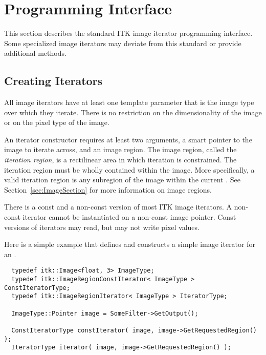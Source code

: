 \section{Programming Interface}
\label{sec:IteratorsInterface}

This section describes the standard ITK image iterator programming interface.
Some specialized image iterators may deviate from this standard or provide
additional methods.

\subsection{Creating Iterators}
\label{sec:CreatingIterators}

All image iterators have at least one template parameter that is the image
type over which they iterate.  There is no restriction on the dimensionality
of the image or on the pixel type of the image.


An iterator constructor requires at least two arguments, a smart pointer to the
image to iterate across, and an image region. The image region, called the
\emph{iteration region}, is a rectilinear area in which iteration is
constrained.  The iteration region must be wholly contained within the image.
More specifically, a valid iteration region is any subregion of the image
within the current .  See Section~\ref{sec:ImageSection}
for more information on image regions.

There is a const and a non-const version of most ITK image iterators. A
non-const iterator cannot be instantiated on a non-const image pointer.
Const versions of iterators may read, but may not write pixel values.

Here is a simple example that defines and constructs a simple image iterator
for an .

\small
\begin{verbatim}
  typedef itk::Image<float, 3> ImageType;
  typedef itk::ImageRegionConstIterator< ImageType > ConstIteratorType;
  typedef itk::ImageRegionIterator< ImageType > IteratorType;

  ImageType::Pointer image = SomeFilter->GetOutput();

  ConstIteratorType constIterator( image, image->GetRequestedRegion() );
  IteratorType iterator( image, image->GetRequestedRegion() );
\end{verbatim}
\normalsize

